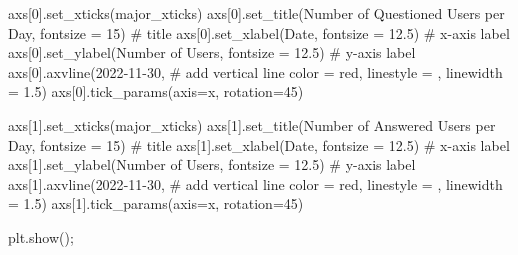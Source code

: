 \documentclass[
  letterpaper,
  DIV=11,
  numbers=noendperiod]{scrartcl}
\newenvironment{Shaded}{\begin{snugshade}}{\end{snugshade}}
\newcommand{\CommentTok}[1]{\textcolor[rgb]{0.37,0.37,0.37}{#1}}
\newcommand{\DecValTok}[1]{\textcolor[rgb]{0.68,0.00,0.00}{#1}}
\newcommand{\FloatTok}[1]{\textcolor[rgb]{0.68,0.00,0.00}{#1}}
\newcommand{\NormalTok}[1]{\textcolor[rgb]{0.00,0.23,0.31}{#1}}
\newcommand{\OperatorTok}[1]{\textcolor[rgb]{0.37,0.37,0.37}{#1}}
\newcommand{\StringTok}[1]{\textcolor[rgb]{0.13,0.47,0.30}{#1}}
\begin{document}
\begin{Shaded}
\begin{Highlighting}[]
\NormalTok{axs[}\DecValTok{0}\NormalTok{].set\_xticks(major\_xticks)}
\NormalTok{axs[}\DecValTok{0}\NormalTok{].set\_title(}\StringTok{\textquotesingle{}Number of Questioned Users per Day\textquotesingle{}}\NormalTok{, fontsize }\OperatorTok{=} \DecValTok{15}\NormalTok{) }\CommentTok{\# title}
\NormalTok{axs[}\DecValTok{0}\NormalTok{].set\_xlabel(}\StringTok{\textquotesingle{}Date\textquotesingle{}}\NormalTok{, fontsize }\OperatorTok{=} \FloatTok{12.5}\NormalTok{) }\CommentTok{\# x{-}axis label}
\NormalTok{axs[}\DecValTok{0}\NormalTok{].set\_ylabel(}\StringTok{\textquotesingle{}Number of Users\textquotesingle{}}\NormalTok{, fontsize }\OperatorTok{=} \FloatTok{12.5}\NormalTok{) }\CommentTok{\# y{-}axis label}
\NormalTok{axs[}\DecValTok{0}\NormalTok{].axvline(}\StringTok{\textquotesingle{}2022{-}11{-}30\textquotesingle{}}\NormalTok{, }\CommentTok{\# add vertical line}
\NormalTok{           color }\OperatorTok{=} \StringTok{\textquotesingle{}red\textquotesingle{}}\NormalTok{,}
\NormalTok{           linestyle }\OperatorTok{=} \StringTok{\textquotesingle{}{-}{-}\textquotesingle{}}\NormalTok{,}
\NormalTok{           linewidth }\OperatorTok{=} \FloatTok{1.5}\NormalTok{)}
\NormalTok{axs[}\DecValTok{0}\NormalTok{].tick\_params(axis}\OperatorTok{=}\StringTok{\textquotesingle{}x\textquotesingle{}}\NormalTok{, rotation}\OperatorTok{=}\DecValTok{45}\NormalTok{)}

\NormalTok{axs[}\DecValTok{1}\NormalTok{].set\_xticks(major\_xticks)}
\NormalTok{axs[}\DecValTok{1}\NormalTok{].set\_title(}\StringTok{\textquotesingle{}Number of Answered Users per Day\textquotesingle{}}\NormalTok{, fontsize }\OperatorTok{=} \DecValTok{15}\NormalTok{) }\CommentTok{\# title}
\NormalTok{axs[}\DecValTok{1}\NormalTok{].set\_xlabel(}\StringTok{\textquotesingle{}Date\textquotesingle{}}\NormalTok{, fontsize }\OperatorTok{=} \FloatTok{12.5}\NormalTok{) }\CommentTok{\# x{-}axis label}
\NormalTok{axs[}\DecValTok{1}\NormalTok{].set\_ylabel(}\StringTok{\textquotesingle{}Number of Users\textquotesingle{}}\NormalTok{, fontsize }\OperatorTok{=} \FloatTok{12.5}\NormalTok{) }\CommentTok{\# y{-}axis label}
\NormalTok{axs[}\DecValTok{1}\NormalTok{].axvline(}\StringTok{\textquotesingle{}2022{-}11{-}30\textquotesingle{}}\NormalTok{, }\CommentTok{\# add vertical line}
\NormalTok{           color }\OperatorTok{=} \StringTok{\textquotesingle{}red\textquotesingle{}}\NormalTok{,}
\NormalTok{           linestyle }\OperatorTok{=} \StringTok{\textquotesingle{}{-}{-}\textquotesingle{}}\NormalTok{,}
\NormalTok{           linewidth }\OperatorTok{=} \FloatTok{1.5}\NormalTok{)}
\NormalTok{axs[}\DecValTok{1}\NormalTok{].tick\_params(axis}\OperatorTok{=}\StringTok{\textquotesingle{}x\textquotesingle{}}\NormalTok{, rotation}\OperatorTok{=}\DecValTok{45}\NormalTok{)}

\NormalTok{plt.show()}\OperatorTok{;}
\end{Highlighting}
\end{Shaded}
\end{document}
